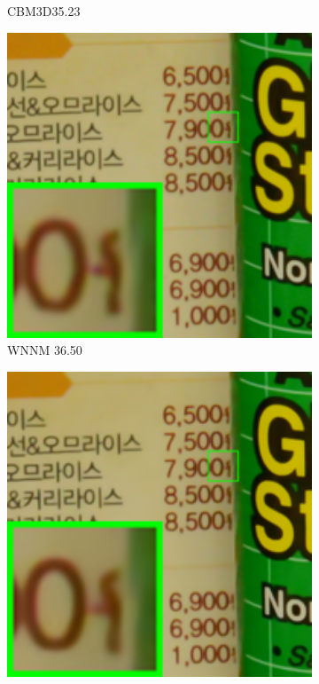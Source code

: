 \begin{figure}
\begin{subfigure}[t]{0.19\textwidth}
		\caption{CBM3D35.23}
    \end{subfigure}
    \hfill
    \begin{subfigure}[t]{0.19\textwidth}
        \centering
        \includegraphics[width=1\textwidth]{images/guided/resize_br_WNNM_CC_Noisy_Nikon_D800_ISO_3200_A3_96.png}
\caption{WNNM 36.50}
    \end{subfigure}
    \hfill
    \begin{subfigure}[t]{0.19\textwidth}
        \centering
        \includegraphics[width=1\textwidth]{images/guided/resize_br_CSF_CC_Noisy_Nikon_D800_ISO_3200_A3_96.png}

\end{subfigure}
\end{figure}
